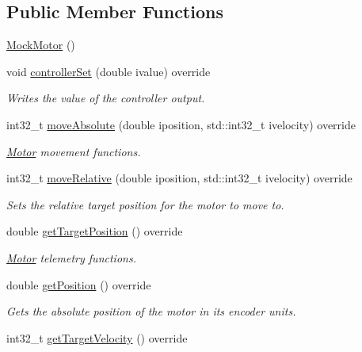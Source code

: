 \subsection*{Public Member Functions}
\begin{DoxyCompactItemize}
\item 
\mbox{\hyperlink{classokapi_1_1MockMotor_a7839202ec706aa1cdec42d14d882430c}{Mock\+Motor}} ()
\item 
void \mbox{\hyperlink{classokapi_1_1MockMotor_a51dc6e5e6995ba24cf40f4687821ea87}{controller\+Set}} (double ivalue) override
\begin{DoxyCompactList}\small\item\em Writes the value of the controller output. \end{DoxyCompactList}\item 
int32\+\_\+t \mbox{\hyperlink{classokapi_1_1MockMotor_aa9535abddff7389f066099b5fe5b9651}{move\+Absolute}} (double iposition, std\+::int32\+\_\+t ivelocity) override
\begin{DoxyCompactList}\small\item\em \mbox{\hyperlink{classokapi_1_1Motor}{Motor}} movement functions. \end{DoxyCompactList}\item 
int32\+\_\+t \mbox{\hyperlink{classokapi_1_1MockMotor_a5a03f26aadb6f40860dc5363f91863b2}{move\+Relative}} (double iposition, std\+::int32\+\_\+t ivelocity) override
\begin{DoxyCompactList}\small\item\em Sets the relative target position for the motor to move to. \end{DoxyCompactList}\item 
double \mbox{\hyperlink{classokapi_1_1MockMotor_a0c9129fba90c380db171c072ada1b9d7}{get\+Target\+Position}} () override
\begin{DoxyCompactList}\small\item\em \mbox{\hyperlink{classokapi_1_1Motor}{Motor}} telemetry functions. \end{DoxyCompactList}\item 
double \mbox{\hyperlink{classokapi_1_1MockMotor_abc8adf400fdadd017c8b082494f9c3a9}{get\+Position}} () override
\begin{DoxyCompactList}\small\item\em Gets the absolute position of the motor in its encoder units. \end{DoxyCompactList}\item 
int32\+\_\+t \mbox{\hyperlink{classokapi_1_1MockMotor_ae4b2cda25c0eec17e0ab4f59fae33a0b}{get\+Target\+Velocity}} () override

\end{DoxyCompactItemize}
